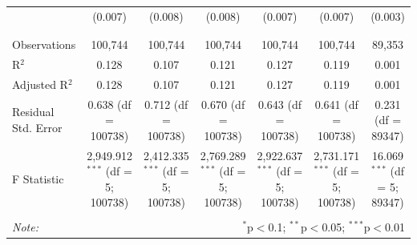 \begin{table}[!htbp]
\begin{tabular}{@{\extracolsep{5pt}}lcccccc}
  & (0.007) & (0.008) & (0.008) & (0.007) & (0.007) & (0.003) \\ 
  & & & & & & \\ 
\hline \\[-1.8ex] 
Observations & 100,744 & 100,744 & 100,744 & 100,744 & 100,744 & 89,353 \\ 
R$^{2}$ & 0.128 & 0.107 & 0.121 & 0.127 & 0.119 & 0.001 \\ 
Adjusted R$^{2}$ & 0.128 & 0.107 & 0.121 & 0.127 & 0.119 & 0.001 \\ 
Residual Std. Error & 0.638 (df = 100738) & 0.712 (df = 100738) & 0.670 (df = 100738) & 0.643 (df = 100738) & 0.641 (df = 100738) & 0.231 (df = 89347) \\ 
F Statistic & 2,949.912$^{***}$ (df = 5; 100738) & 2,412.335$^{***}$ (df = 5; 100738) & 2,769.289$^{***}$ (df = 5; 100738) & 2,922.637$^{***}$ (df = 5; 100738) & 2,731.171$^{***}$ (df = 5; 100738) & 16.069$^{***}$ (df = 5; 89347) \\ 
\hline 
\hline \\[-1.8ex] 
\textit{Note:}  & \multicolumn{6}{r}{$^{*}$p$<$0.1; $^{**}$p$<$0.05; $^{***}$p$<$0.01} \\ 
\end{tabular} 
\end{table} 

